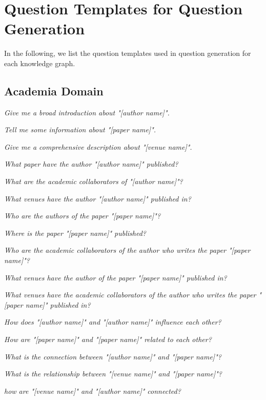 \section{Question Templates for Question Generation}\label{sec:question_template_appendix}

In the following, we list the question templates used in question generation for each knowledge graph.

\subsection{Academia Domain}


\squishlist
\item \textit{Give me a broad introduction about "[author name]".}
\item \textit{Tell me some information about "[paper name]".}
\item \textit{Give me a comprehensive description about "[venue name]".}
\squishend


\squishlist
\item \textit{What paper have the author "[author name]" published?}
\item \textit{What are the academic collaborators of "[author name]"?}
\item \textit{What venues have the author "[author name]" published in?}
\item \textit{Who are the authors of the paper "[paper name]"?}
\item \textit{Where is the paper "[paper name]" published?}
\item \textit{Who are the academic collaborators of the author who writes the paper "[paper name]"?}
\item \textit{What venues have the author of the paper "[paper name]" published in?}
\item \textit{What venues have the academic collaborators of the author who writes the paper "[paper name]" published in?}
\squishend


\squishlist
\item \textit{How does "[author name]" and "[author name]" influence each other?}
\item \textit{How are "[paper name]" and "[paper name]" related to each other?}
\item \textit{What is the connection between "[author name]" and "[paper name]"?}
\item \textit{What is the relationship between "[venue name]" and "[paper name]"?}
\item \textit{how are "[venue name]" and "[author name]" connected?}
\squishend

